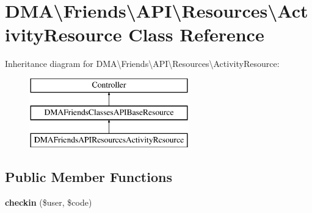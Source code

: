 \hypertarget{classDMA_1_1Friends_1_1API_1_1Resources_1_1ActivityResource}{}\section{D\+M\+A\textbackslash{}Friends\textbackslash{}A\+P\+I\textbackslash{}Resources\textbackslash{}Activity\+Resource Class Reference}
\label{classDMA_1_1Friends_1_1API_1_1Resources_1_1ActivityResource}
Inheritance diagram for D\+M\+A\textbackslash{}Friends\textbackslash{}A\+P\+I\textbackslash{}Resources\textbackslash{}Activity\+Resource\+:\begin{figure}[H]
\begin{center}
\leavevmode
\includegraphics[height=3.000000cm]{dd/df6/classDMA_1_1Friends_1_1API_1_1Resources_1_1ActivityResource}
\end{center}
\end{figure}
\subsection*{Public Member Functions}
\begin{DoxyCompactItemize}
\item 
\hypertarget{classDMA_1_1Friends_1_1API_1_1Resources_1_1ActivityResource_aac66e5a0f9d705f2ff25aa53374de1d1}{}{\bfseries checkin} (\$user, \$code)\label{classDMA_1_1Friends_1_1API_1_1Resources_1_1ActivityResource_aac66e5a0f9d705f2ff25aa53374de1d1}

\end{DoxyCompactItemize}
